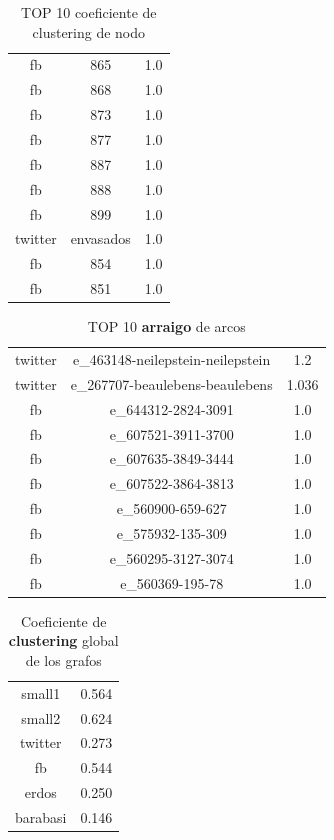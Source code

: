 \documentclass[palatino]{apuntes}
\begin{document}
\begin{table}[h!]
\centering
\caption{TOP 10 coeficiente de clustering de nodo}
\begin{tabular}{ccc}
fb&865&1.0\\
fb&868&1.0\\
fb&873&1.0\\
fb&877&1.0\\
fb&887&1.0\\
fb&888&1.0\\
fb&899&1.0\\
twitter&envasados&1.0\\
fb&854&1.0\\
fb&851&1.0\\
\end{tabular}
\end{table}



\begin{table}[h!]
\centering
\caption{TOP 10 \textbf{arraigo} de arcos}
\begin{tabular}{ccc}
twitter & e\_463148-neilepstein-neilepstein  &  1.2\\
twitter & e\_267707-beaulebens-beaulebens  &  1.036\\
fb & e\_644312-2824-3091  &  1.0\\
fb & e\_607521-3911-3700  &  1.0\\
fb & e\_607635-3849-3444  &  1.0\\
fb & e\_607522-3864-3813  &  1.0\\
fb & e\_560900-659-627  &  1.0\\
fb & e\_575932-135-309  &  1.0\\
fb & e\_560295-3127-3074  &  1.0\\
fb & e\_560369-195-78  &  1.0\\
\end{tabular} 
\end{table} 



\begin{table}[h!]
\centering
\caption{Coeficiente de \textbf{clustering} global de los grafos}
\begin{tabular}{cc}
small1 & 0.564\\
small2 & 0.624\\
twitter & 0.273\\
fb & 0.544\\
erdos & 0.250\\
barabasi  &0.146\\
\end{tabular}
\end{table}
\end{document}
